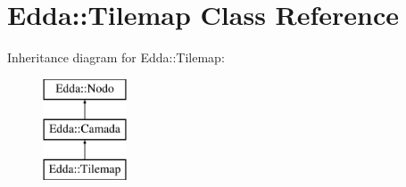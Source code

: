 \hypertarget{class_edda_1_1_tilemap}{
\section{Edda::Tilemap Class Reference}
\label{class_edda_1_1_tilemap}
}
Inheritance diagram for Edda::Tilemap:\begin{figure}[H]
\begin{center}
\leavevmode
\includegraphics[height=3.000000cm]{class_edda_1_1_tilemap}
\end{center}
\end{figure}
